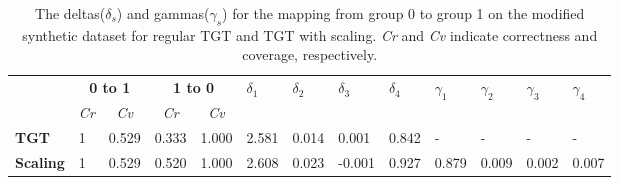\begin{table}[]
\begin{tabular}{|l|l|l|l|l|l|l|l|l|l|l|l|l|}
\hline
 & \multicolumn{2}{c|}{\textbf{0 to 1}} & \multicolumn{2}{c|}{\textbf{1 to 0}} & \multirow{2}{*}{$\delta_1$} & \multirow{2}{*}{$\delta_2$} & \multirow{2}{*}{$\delta_3$} & \multirow{2}{*}{$\delta_4$} & \multirow{2}{*}{$\gamma_1$} & \multirow{2}{*}{$\gamma_2$} & \multirow{2}{*}{$\gamma_3$} & \multirow{2}{*}{$\gamma_4$} \\ \cline{1-5}
 & \multicolumn{1}{c|}{\textit{Cr}} & \multicolumn{1}{c|}{\textit{Cv}} & \multicolumn{1}{c|}{\textit{Cr}} & \multicolumn{1}{c|}{\textit{Cv}} &  &  &  &  &  &  &  &  \\ \hline
\textbf{TGT} & 1 & 0.529 & 0.333 & 1.000 & 2.581 & 0.014 & 0.001 & 0.842 & - & - & - & - \\ \hline
\textbf{Scaling} & 1 & 0.529 & 0.520 & 1.000 & 2.608 & 0.023 & -0.001 & 0.927 & 0.879 & 0.009 & 0.002 & 0.007 \\ \hline
\end{tabular}

\caption{The deltas($\delta_s$) and gammas($\gamma_s$) for the mapping from group 0 to group 1 on the modified synthetic dataset for regular TGT and TGT with scaling. \textit{Cr} and \textit{Cv} indicate correctness and coverage, respectively.}
\label{tab:synth_modified_results}
\end{table}


